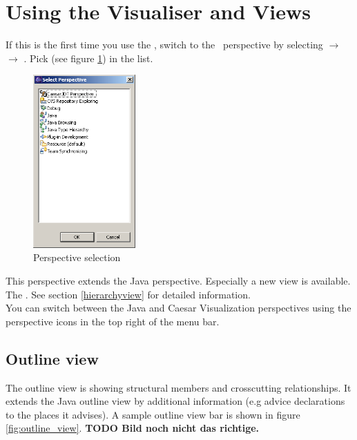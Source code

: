 \section{Using the Visualiser and Views}
If this is the first time you use the \cjdt, switch to the \caesarj ~perspective by selecting  $\rightarrow$  $\rightarrow$ . Pick  (see figure \ref{fig:select_persp}) in the list.

\begin{figure}[htbp]
	\centering
		\includegraphics[width=0.35\textwidth]{images/select_persp.png}
	\caption{Perspective selection}
	\label{fig:select_persp}
\end{figure}

This perspective extends the Java perspective. Especially a new view is available. The . See section \ref{hierarchyview} for detailed information.\\
You can switch between the Java and Caesar Visualization perspectives using the perspective icons in the top right of the menu bar.\\
\subsection{Outline view}
The outline view is showing structural members and crosscutting relationships. It extends the Java outline view by additional information (e.g advice declarations to the places it advises). A sample outline view bar is shown in figure \ref{fig:outline_view}. \textbf{TODO Bild noch nicht das richtige.}\\

